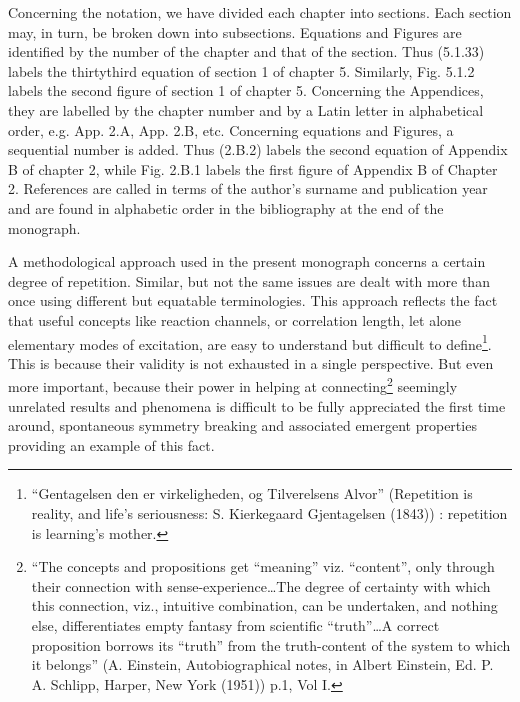 Concerning the notation, we have divided each chapter into sections. Each section may, in turn, be broken down into subsections. Equations and Figures are identified by the number of the chapter and that of the section. Thus (5.1.33) labels the thirtythird equation of section 1 of chapter 5. Similarly, Fig. 5.1.2 labels the second figure of section 1 of chapter 5. Concerning the Appendices, they are labelled by the chapter number and by a Latin letter in alphabetical order, e.g. App. 2.A, App. 2.B, etc. Concerning equations and Figures, a sequential number is added. Thus (2.B.2) labels the second equation of Appendix B of chapter 2, while Fig. 2.B.1 labels the first figure of Appendix B of Chapter 2. References are called  in terms of the author's surname and publication year and are found in alphabetic order in the bibliography at the end of the monograph.

A methodological approach used in the present monograph concerns a certain degree of repetition. Similar, but not the same issues are dealt with more than once using different but equatable terminologies. This approach reflects the fact that useful concepts like reaction channels, or correlation length, let alone elementary modes of excitation, are easy to understand but difficult to define\footnote{``Gentagelsen den er virkeligheden, og Tilverelsens Alvor'' (Repetition is reality, and life's seriousness: S. Kierkegaard Gjentagelsen (1843)) {} : repetition is learning's mother.}. This is because their validity is not exhausted in a single perspective. But even more important, because their power in helping at connecting\footnote{``The concepts and propositions get ``meaning'' viz. ``content'', only through their connection with sense-experience\dots The degree of certainty with which this connection, viz., intuitive combination, can be undertaken, and nothing else, differentiates empty fantasy from scientific ``truth''\dots A correct proposition borrows its ``truth'' from the truth-content of the system to which it belongs'' (A. Einstein, Autobiographical notes, in Albert Einstein, Ed. P. A. Schlipp, Harper, New York (1951)) p.1, Vol I.} seemingly unrelated results and phenomena is difficult to be fully appreciated the first time around, spontaneous symmetry breaking and associated emergent properties providing an example of this fact.

